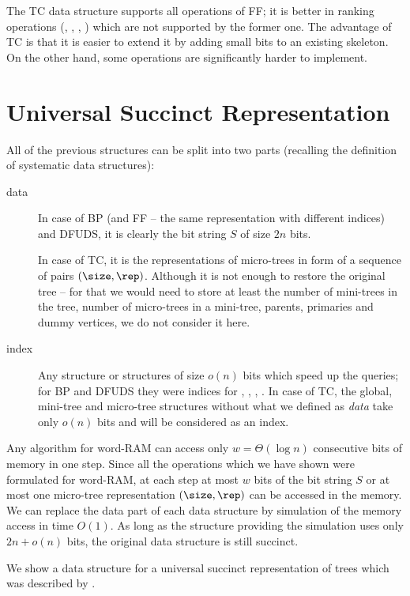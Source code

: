The TC data structure supports all operations of FF; it is better in ranking operations (\postRank{}, \postSelect{}, \dfudsRank{}, \dfudsSelect{}) which are not supported by the former one.
The advantage of TC is that it is easier to extend it by adding small bits to an existing skeleton.
On the other hand, some operations are significantly harder to implement.

\section{Universal Succinct Representation}

All of the previous structures can be split into two parts (recalling the definition of systematic data structures):
\begin{description}
	\item[data]
	In case of BP (and FF -- the same representation with different indices) and DFUDS, it is clearly the bit string $S$ of size $2n$ bits.

	In case of TC, it is the representations of micro-trees in form of a sequence of pairs $(\size, \rep)$.
	Although it is not enough to restore the original tree -- for that we would need to store at least the number of mini-trees in the tree, number of micro-trees in a mini-tree, parents, primaries and dummy vertices, we do not consider it here.
	
	\item[index] 
	Any structure or structures of size $o(n)$ bits which speed up the queries; for BP and DFUDS they were indices for \rank{}, \select{}, \match{}, \rmqi{}.
	In case of TC, the global, mini-tree and micro-tree structures without what we defined as \emph{data} take only $o(n)$ bits and will be considered as an index.
\end{description}

Any algorithm for word-RAM can access only $w = \Theta(\log n)$ consecutive bits of memory in one step.
Since all the operations which we have shown were formulated for word-RAM, at each step at most $w$ bits of the bit string $S$ or at most one micro-tree representation $(\size, \rep)$ can be accessed in the memory.
We can replace the data part of each data structure by simulation of the memory access in time $O(1)$.
As long as the structure providing the simulation uses only $2n + o(n)$ bits, the original data structure is still succinct.

We show a data structure for a universal succinct representation of trees which was described by \cite{farzan2009universal}.

